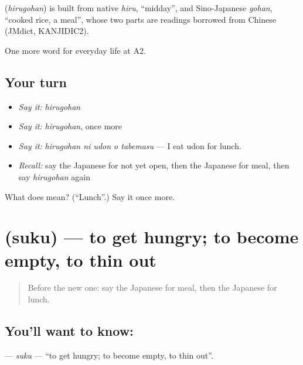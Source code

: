 \begin{cousinweb}
\textbf{} (\emph{hirugohan}) is built from native \emph{hiru}, \textquotedblleft{}midday\textquotedblright{}, and Sino-Japanese \emph{gohan}, \textquotedblleft{}cooked rice, a meal\textquotedblright{}, whose two parts are readings borrowed from Chinese (JMdict, KANJIDIC2).
\end{cousinweb}

\begin{grammarlens}[title={What you've built}]
One more word for everyday life at A2.
\end{grammarlens}

\subsection*{Your turn}
\begin{itemize}
\raggedright
  \item \emph{Say it:} \emph{hirugohan}
  \item \emph{Say it:} \emph{hirugohan}, once more
  \item \emph{Say it:} \emph{hirugohan ni udon o tabemasu} — I eat udon for lunch.
  \item \emph{Recall:} say the Japanese for not yet open, then the Japanese for meal, then say \emph{hirugohan} again
\end{itemize}

\begin{tcolorbox}[breakable,colback=teal!4,colframe=teal!35!black,title={Before you move on}]
What does  mean? (\textquotedblleft{}Lunch\textquotedblright{}.) Say it once more.
\end{tcolorbox}
\section[\texorpdfstring{\ja{すく} (suku)}{すく (suku)}]{ (suku) — to get hungry; to become empty, to thin out}

\label{lesson:JA-C172-suku}



\begin{quote}
Before the new one: say the Japanese for meal, then the Japanese for lunch.
\end{quote}

\subsection*{You'll want to know: }
\textbf{} — \emph{suku} — \textquotedblleft{}to get hungry; to become empty, to thin out\textquotedblright{}.

